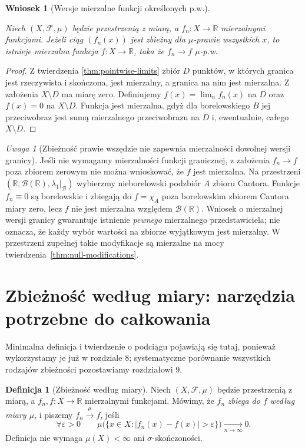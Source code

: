 \documentclass[11pt,a4paper,oneside]{book}
\numberwithin{equation}{chapter}
\theoremstyle{plain}
\newtheorem{wniosek}[twierdzenie]{Wniosek}
\theoremstyle{definition}
\newtheorem{definicja}[twierdzenie]{Definicja}
\theoremstyle{remark}
\newtheorem{uwaga}[twierdzenie]{Uwaga}
\begin{document}
\begin{wniosek}[Wersje mierzalne funkcji określonych p.w.]\label{idx:06:wniosek:15}

Niech $(X,\mathcal F,\mu)$ będzie przestrzenią z miarą,
a $f_n:X\to\mathbb R$ mierzalnymi funkcjami.
Jeżeli ciąg $(f_n(x))$ jest zbieżny dla
$\mu$-prawie wszystkich $x$, to istnieje
mierzalna funkcja $f:X\to\mathbb R$, taka że
$f_n\to f$ $\mu$-p.w.
\end{wniosek}
\begin{proof}
Z twierdzenia \ref{thm:pointwise-limits} zbiór $D$
punktów, w których granica jest rzeczywista i
skończona, jest mierzalny, a granica na nim jest mierzalna.
Z założenia $X\setminus D$ ma miarę zero.
Definiujemy $f(x)=\lim_nf_n(x)$ na $D$ oraz
$f(x)=0$ na $X\setminus D$. Funkcja jest mierzalna,
gdyż dla borelowskiego $B$ jej przeciwobraz jest
sumą mierzalnego przeciwobrazu na $D$ i,
ewentualnie, całego $X\setminus D$.
\end{proof}

\begin{uwaga}[Zbieżność prawie wszędzie nie zapewnia mierzalności dowolnej wersji granicy]
\label{rem:noncomplete-ae-limit-6}
Jeśli nie wymagamy mierzalności funkcji granicznej,
z założenia $f_n\to f$ poza zbiorem zerowym nie można
wnioskować, że $f$ jest mierzalna. Na przestrzeni
$(\mathbb R,\mathcal B(\mathbb R),\lambda_1|_{\mathcal B})$
wybierzmy nieborelowski podzbiór $A$ zbioru Cantora.
Funkcje $f_n\equiv0$ są borelowskie i zbiegają do
$f=\chi_A$ poza borelowskim zbiorem Cantora miary zero,
lecz $f$ nie jest mierzalna względem $\mathcal B(\mathbb R)$.
Wniosek o mierzalnej wersji granicy gwarantuje istnienie
\emph{pewnego} mierzalnego przedstawiciela; nie oznacza,
że każdy wybór wartości na zbiorze wyjątkowym jest
mierzalny. W przestrzeni zupełnej takie modyfikacje są
mierzalne na mocy twierdzenia~\ref{thm:null-modifications}.
\end{uwaga}

\section{Zbieżność według miary: narzędzia potrzebne do całkowania}
Minimalna definicja i twierdzenie o podciągu pojawiają się tutaj,
ponieważ wykorzystamy je już w rozdziale 8; systematyczne porównanie
wszystkich rodzajów zbieżności pozostawiamy rozdziałowi 9.


\begin{definicja}[Zbieżność według miary]
\label{def:convergence-measure}
Niech $(X,\mathcal F,\mu)$ będzie przestrzenią z miarą,
a $f_n,f:X\to\mathbb R$ mierzalnymi funkcjami.
Mówimy, że $f_n$ \emph{zbiega do $f$ według miary $\mu$},
i piszemy $f_n\xrightarrow{\mu}f$, jeśli
\[
\forall\varepsilon>0\qquad
\mu\bigl(\{x\in X:|f_n(x)-f(x)|>\varepsilon\}\bigr)
\xrightarrow[n\to\infty]{}0.
\]
Definicja nie wymaga $\mu(X)<\infty$ ani
$\sigma$-skończoności.
\end{definicja}
\end{document}
